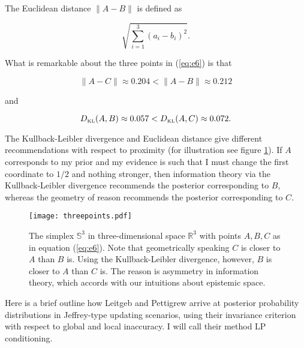 \documentclass[11pt]{article} \usepackage{october} \onehalfspacing
\begin{document}
The Euclidean distance $\|A-B\|$ is defined as

\begin{equation}
  \label{eq:e3}
  \sqrt{\sum_{i=1}^{3}\left(a_{i}-b_{i}\right)^{2}}.
\end{equation}

What is remarkable about the three points in (\ref{eq:e6}) is that

\begin{equation}
  \label{eq:e8}
  \|A-C\|\approx{}0.204<\|A-B\|\approx{}0.212
\end{equation}

and

\begin{equation}
  \label{eq:e9}
  D_{\mbox{\tiny KL}}(A,B)\approx{}0.057<D_{\mbox{\tiny KL}}(A,C)\approx{}0.072.
\end{equation}

The Kullback-Leibler divergence and Euclidean distance give different
recommendations with respect to proximity (for illustration see figure
\ref{fig:threepoints}). If $A$ corresponds to my prior and my evidence
is such that I must change the first coordinate to $1/2$ and nothing
stronger, then information theory via the Kullback-Leibler divergence
recommends the posterior corresponding to $B$, whereas the geometry of
reason recommends the posterior corresponding to $C$.

\begin{figure}[ht]
  \begin{flushright}
    \begin{minipage}[h]{.7\linewidth}
      \texttt{[image: threepoints.pdf]}
      \caption{\footnotesize The simplex $\mathbb{S}^{3}$ in
        three-dimensional space $\mathbb{R}^{3}$ with points $A,B,C$
        as in equation (\ref{eq:e6}). Note that geometrically speaking
        $C$ is closer to $A$ than $B$ is. Using the Kullback-Leibler
        divergence, however, $B$ is closer to $A$ than $C$ is. The
        reason is asymmetry in information theory, which accords with
        our intuitions about epistemic space.}
      \label{fig:threepoints}
    \end{minipage}
  \end{flushright}
\end{figure}

Here is a brief outline how Leitgeb and Pettigrew arrive at posterior
probability distributions in Jeffrey-type updating scenarios, using
their invariance criterion with respect to global and local
inaccuracy. I will call their method LP conditioning.
\end{document}
